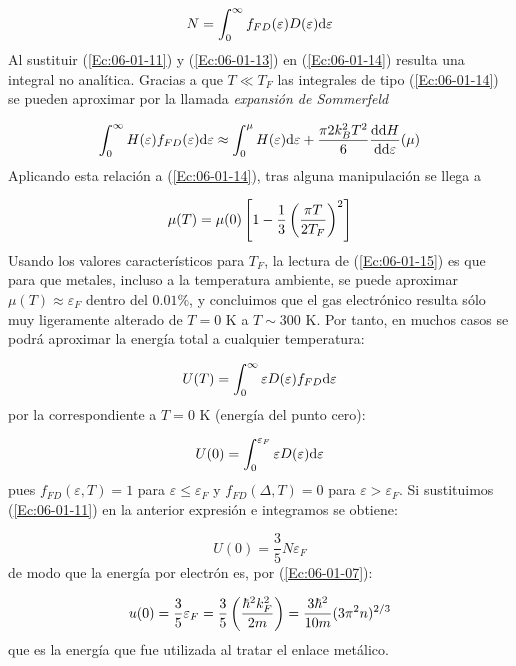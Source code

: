 \begin{equation}
	N=\int_0^{\infty} f_{FD} (\varepsilon) D (\varepsilon) \mathrm{d} \varepsilon  \label{Ec:06-01-14}
\end{equation}
Al sustituir (\ref{Ec:06-01-11}) y (\ref{Ec:06-01-13}) en (\ref{Ec:06-01-14})  resulta una integral no analítica. Gracias a que $T\ll T_F$ las integrales de tipo (\ref{Ec:06-01-14}) se pueden aproximar por la llamada \textit{expansión de Sommerfeld} 

\begin{eqnarray}
	\int_{0}^{\infty} H(\varepsilon) f_{FD} (\varepsilon)  \mathrm{d} \varepsilon \approx \int_0^\mu H(\varepsilon) \mathrm{d} \varepsilon + \frac{\pi2 k_B^2 T^2}{6} \frac{\mathrm{d} \mathrm{d} H}{\mathrm{d} \mathrm{d} \varepsilon} (\mu)
\end{eqnarray}
Aplicando esta relación a (\ref{Ec:06-01-14}), tras alguna manipulación se llega a 

\begin{equation}
	\mu (T) = \mu(0) \left[ 1-\frac{1}{3} \left( \frac{\pi T}{2 T_F} \right)^2 \right]
	\label{Ec:06-01-15}
\end{equation}
Usando los valores característicos para $T_F$, la lectura  de (\ref{Ec:06-01-15}) es que para que metales, incluso a la temperatura ambiente, se puede aproximar $\mu (T) \approx \varepsilon_F$ dentro del $0.01\%$, y concluimos que el gas electrónico resulta sólo muy ligeramente alterado de $T=0$ K a $T\sim 300$ K. Por tanto, en muchos casos se podrá aproximar la energía total a cualquier temperatura:

\begin{equation}
	U(T) = \int_0^\infty \varepsilon D(\varepsilon) f_{FD} \mathrm{d} \varepsilon 
\end{equation}
por la correspondiente a $T=0$ K (energía del punto cero):

\begin{equation}
	U(0) = \int_0^{\varepsilon_F} \varepsilon D(\varepsilon) \mathrm{d} \varepsilon
\end{equation}
pues $f_{FD}(\varepsilon,T)=1$ para $\varepsilon\leq\varepsilon_F$ y $f_{FD} (\varDelta,T)=0$ para $\varepsilon>\varepsilon_F$. Si sustituimos (\ref{Ec:06-01-11})	en la anterior expresión e integramos se obtiene:

\begin{equation}
	U(0)=\frac{3}{5} N \varepsilon_F
\end{equation}
de modo que la energía por electrón es, por (\ref{Ec:06-01-07}):

\begin{equation}
	u(0)=\frac{3}{5} \varepsilon_F = \frac{3}{5} \left( \frac{\hbar^2 k_F^2}{2m} \right) = \frac{3\hbar^2}{10m} (3 \pi^2 n)^{2/3}
\end{equation}
que es la energía que fue utilizada al tratar el enlace metálico.


